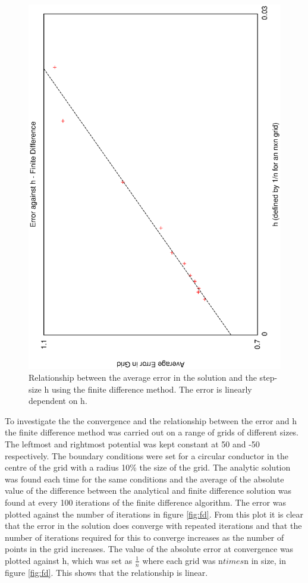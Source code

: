 \documentclass[aps,twocolumn,pre,nofootinbib,10pt]{revtex4-1}
\begin{document}
\begin{figure}
\includegraphics[height=\breite \columnwidth,angle=-90]{fd_h.eps}

\caption{Relationship between the average error in the solution and the step-size h using the finite difference method. The error is linearly dependent on h.}
\label{fig:fd_lin}
\end{figure}

To investigate the the convergence and the relationship between the error and h the finite difference method was carried out on a range of grids of different sizes. The leftmost and rightmost potential was kept constant at 50 and -50 respectively. The boundary conditions were set for a circular conductor in the centre of the grid with a radius 10\% the size of the grid. The analytic solution was found each time for the same conditions and the average of the absolute value of the difference between the analytical and finite difference solution was found at every 100 iterations of the finite difference algorithm. The error was plotted against the number of iterations in figure \ref{fig:fd}. From this plot it is clear that the error in the solution does converge with repeated iterations and that the number of iterations required for this to converge increases as the number of points in the grid increases. 
The value of the absolute error at convergence was plotted against h, which was set as \(\frac{1}{n}\) where each grid was n$times$n in size, in figure \ref{fig:fd}. This shows that the relationship is linear.
\end{document}
